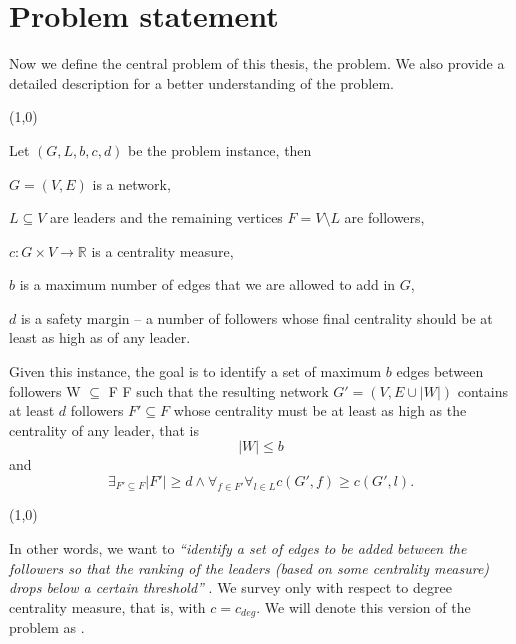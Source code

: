 \chapter{Problem statement}\label{chapter:ProblemStatement}

Now we define the central problem of this thesis, the \HL problem.
We also provide a detailed description for a better understanding of the problem.

\begin{center}
    \line(1,0){\textwidth}
\end{center}
\begin{definition}\label{HL}
    Let $(G, L, b, c, d)$ be the problem instance, then
    \begin{description}
        \item $G = (V, E)$ is a network,
        \item $L \subseteq V$ are leaders and the remaining vertices $F = V \setminus L$ are followers,
        \item $c : G \times V \rightarrow \mathbb{R}$ is a centrality measure,
        \item $b$ is a maximum number of edges that we are allowed to add in $G$,
        \item $d$ is a safety margin -- a number of followers whose final centrality should be at least as high as of any leader.
    \end{description}
    Given this instance, the goal is to identify a set of maximum $b$ edges between followers W $\subseteq$ F {\texttimes} F
    such that the resulting network $G' = (V, E \cup |W|)$ contains at least $d$ followers $F' \subseteq F$
    whose centrality must be at least as high as the centrality of any leader, that is
    $$|W| \leq b$$
    and
    $$\exists_{F' \subseteq F} |F'| \geq d \wedge \forall_{f \in F'} \forall_{l \in L} c(G', f) \geq c(G', l).$$
\end{definition}
\begin{center}
    \line(1,0){\textwidth}
\end{center}

In other words, we want to \emph{``identify a set of edges to be added between the followers so that
the ranking of the leaders (based on some centrality measure) drops below a certain threshold''} \cite{Waniek2017}.
We survey \HLshort only with respect to degree centrality measure, that is, with $c = c_{deg}$.
We will denote this version of the problem as \HLdeg.

